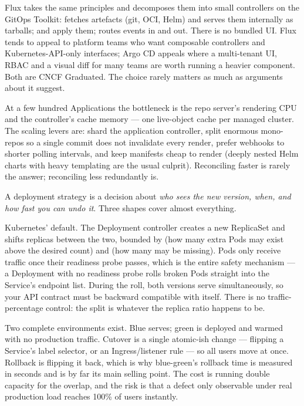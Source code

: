  Flux takes the same principles and decomposes them into small controllers on the GitOps Toolkit:  fetches artefacts (git, OCI, Helm) and serves them internally as tarballs;  and  apply them;  routes events in and out. There is no bundled UI. Flux tends to appeal to platform teams who want composable controllers and Kubernetes-API-only interfaces; Argo CD appeals where a multi-tenant UI, RBAC and a visual diff for many teams are worth running a heavier component. Both are CNCF Graduated. The choice rarely matters as much as arguments about it suggest.

\begin{scalenote}
At a few hundred Applications the bottleneck is the repo server's rendering CPU and the controller's cache memory --- one live-object cache per managed cluster. The scaling levers are: shard the application controller, split enormous mono-repos so a single commit does not invalidate every render, prefer webhooks to shorter polling intervals, and keep manifests cheap to render (deeply nested Helm charts with heavy templating are the usual culprit). Reconciling faster is rarely the answer; reconciling less redundantly is.
\end{scalenote}


 A deployment strategy is a decision about \emph{who sees the new version, when, and how fast you can undo it}. Three shapes cover almost everything.

 Kubernetes' default. The Deployment controller creates a new ReplicaSet and shifts replicas between the two, bounded by  (how many extra Pods may exist above the desired count) and  (how many may be missing). Pods only receive traffic once their readiness probe passes, which is the entire safety mechanism --- a Deployment with no readiness probe rolls broken Pods straight into the Service's endpoint list. During the roll, both versions serve simultaneously, so your API contract must be backward compatible with itself. There is no traffic-percentage control: the split is whatever the replica ratio happens to be.

 Two complete environments exist. Blue serves; green is deployed and warmed with no production traffic. Cutover is a single atomic-ish change --- flipping a Service's label selector, or an Ingress/listener rule --- so all users move at once. Rollback is flipping it back, which is why blue-green's rollback time is measured in seconds and is by far its main selling point. The cost is running double capacity for the overlap, and the risk is that a defect only observable under real production load reaches 100\% of users instantly.

